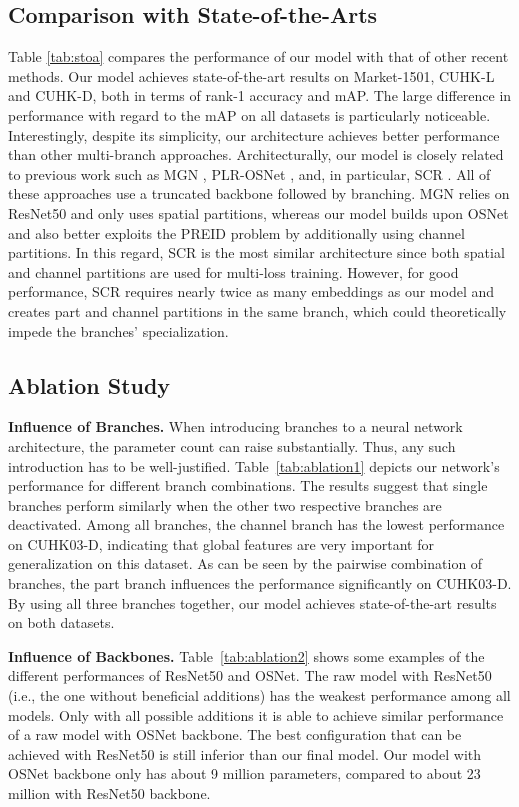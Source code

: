 \documentclass{article}
\newcommand{\nparagraph}[1]{\noindent\textbf{#1.  }}
\begin{document}
\subsection{Comparison with State-of-the-Arts}
Table \ref{tab:stoa} compares the performance of our model with that of other recent methods. Our model achieves state-of-the-art results on Market-1501, CUHK-L and CUHK-D, both in terms of rank-1 accuracy and mAP. The large difference in performance with regard to the mAP on all datasets is particularly noticeable. Interestingly, despite its simplicity, our architecture achieves better performance than other multi-branch approaches. Architecturally, our model is closely related to previous work such as MGN \cite{wang2018learning}, PLR-OSNet \cite{xie2020learning}, and, in particular, SCR \cite{chen2020learning}. All of these approaches use a truncated backbone followed by branching. MGN relies on ResNet50 and only uses spatial partitions, whereas our model builds upon OSNet and also better exploits the \ac{PREID} problem by additionally using channel partitions. In this regard, SCR is the most similar architecture since both spatial and channel partitions are used for multi-loss training. However, for good performance, SCR requires nearly twice as many embeddings as our model and creates part and channel partitions in the same branch, which could theoretically impede the branches' specialization.


\subsection{Ablation Study}
\nparagraph{Influence of Branches}
When introducing branches to a neural network architecture, the parameter count can raise substantially. Thus, any such introduction has to be well-justified. Table~\ref{tab:ablation1} depicts our network's performance for different branch combinations. The results suggest that single branches perform similarly when the other two respective branches are deactivated. Among all branches, the channel branch has the lowest performance on CUHK03-D, indicating that global features are very important for generalization on this dataset. As can be seen by the pairwise combination of branches, the part branch influences the performance significantly on CUHK03-D. By using all three branches together, our model achieves state-of-the-art results on both datasets.

\nparagraph{Influence of Backbones} Table~\ref{tab:ablation2} shows some examples of the different performances of ResNet50 and OSNet. The raw model with ResNet50 (i.e., the one without beneficial additions) has the weakest performance among all models. Only with all possible additions it is able to achieve  similar performance of a raw model with OSNet backbone. The best configuration that can be achieved with ResNet50 is still inferior than our final model. Our model with OSNet backbone only has about 9 million parameters, compared to about 23 million with ResNet50 backbone.
\end{document}
